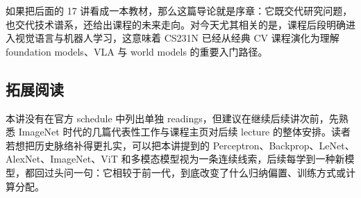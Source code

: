 \documentclass[a4paper]{article}
\begin{document}
如果把后面的 17 讲看成一本教材，那么这篇导论就是序章：它既交代研究问题，也交代技术谱系，还给出课程的未来走向。对今天尤其相关的是，课程后段明确进入视觉语言与机器人学习，这意味着 CS231N 已经从经典 CV 课程演化为理解 foundation models、VLA 与 world models 的重要入门路径。

\subsection{拓展阅读}
本讲没有在官方 schedule 中列出单独 readings，但建议在继续后续讲次前，先熟悉 ImageNet 时代的几篇代表性工作与课程主页对后续 lecture 的整体安排。读者若想把历史脉络补得更扎实，可以把本讲提到的 Perceptron、Backprop、LeNet、AlexNet、ImageNet、ViT 和多模态模型视为一条连续线索，后续每学到一种新模型，都回过头问一句：它相较于前一代，到底改变了什么归纳偏置、训练方式或计算分配。


\end{document}

